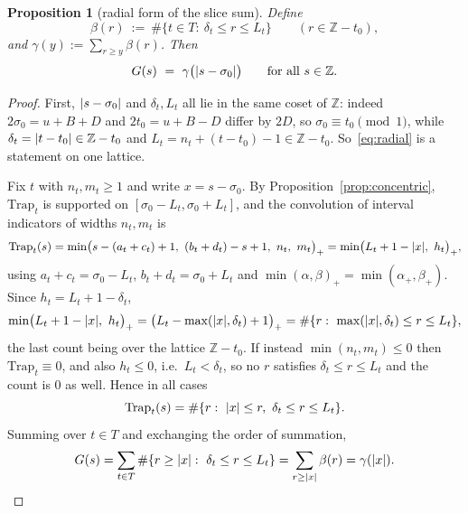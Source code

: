 \documentclass[11pt]{article}
\newtheorem{proposition}[theorem]{Proposition}
\theoremstyle{definition}
\newcommand{\Z}{\mathbb Z}
\DeclarePairedDelimiter{\abs}{\lvert}{\rvert}
\begin{document}
\begin{proposition}[radial form of the slice sum]\label{prop:radial}
Define
\begin{equation}\label{eq:beta}
  \beta(r)\ :=\ \#\{t\in T:\ \delta_t\le r\le L_t\}\qquad (r\in\Z-t_0),
\end{equation}
and $\gamma(y):=\sum_{r\ge y}\beta(r)$. Then
\begin{equation}\label{eq:radial}
  G(s)\ =\ \gamma\bigl(\abs{s-\sigma_0}\bigr)\qquad\text{for all }s\in\Z .
\end{equation}
\end{proposition}
\begin{proof}
First, $\abs{s-\sigma_0}$ and $\delta_t,L_t$ all lie in the same coset of $\Z$: indeed
$2\sigma_0=u+B+D$ and $2t_0=u+B-D$ differ by $2D$, so $\sigma_0\equiv t_0\pmod 1$, while
$\delta_t=\abs{t-t_0}\in\Z-t_0$ and $L_t=n_t+(t-t_0)-1\in\Z-t_0$. So~\eqref{eq:radial} is a
statement on one lattice.

Fix $t$ with $n_t,m_t\ge1$ and write $x=s-\sigma_0$. By Proposition~\ref{prop:concentric},
$\mathrm{Trap}_t$ is supported on $[\sigma_0-L_t,\sigma_0+L_t]$, and the convolution of
interval indicators of widths $n_t,m_t$ is
\[
  \mathrm{Trap}_t(s)=\min\bigl(s-(a_t+c_t)+1,\ (b_t+d_t)-s+1,\ n_t,\ m_t\bigr)_+
   =\min\bigl(L_t+1-\abs{x},\ h_t\bigr)_+ ,
\]
using $a_t+c_t=\sigma_0-L_t$, $b_t+d_t=\sigma_0+L_t$ and
$\min(\alpha,\beta)_+=\min(\alpha_+,\beta_+)$. Since $h_t=L_t+1-\delta_t$,
\[
  \min\bigl(L_t+1-\abs{x},\ h_t\bigr)_+
  =\bigl(L_t-\max(\abs{x},\delta_t)+1\bigr)_+
  =\#\{r:\ \max(\abs{x},\delta_t)\le r\le L_t\},
\]
the last count being over the lattice $\Z-t_0$. If instead $\min(n_t,m_t)\le0$ then
$\mathrm{Trap}_t\equiv0$, and also $h_t\le0$, i.e.\ $L_t<\delta_t$, so no $r$ satisfies
$\delta_t\le r\le L_t$ and the count is $0$ as well. Hence in all cases
\[
  \mathrm{Trap}_t(s)=\#\{r:\ \abs{x}\le r,\ \delta_t\le r\le L_t\}.
\]
Summing over $t\in T$ and exchanging the order of summation,
\[
  G(s)=\sum_{t\in T}\#\{r\ge\abs{x}:\ \delta_t\le r\le L_t\}
      =\sum_{r\ge\abs{x}}\beta(r)=\gamma(\abs{x}).\qedhere
\]
\end{proof}
\end{document}
